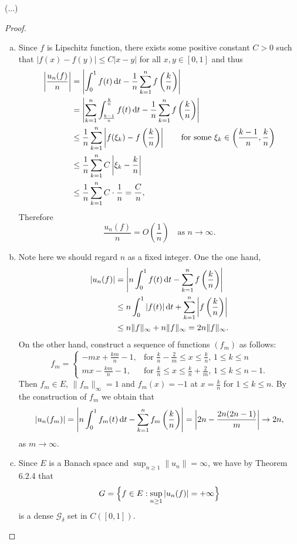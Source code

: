 \begin{exercise}
  (...)
\end{exercise}

\begin{proof}
  \begin{enumerate}[(a)]
    \item Since $f$ is Lipschitz function, there exists some positive constant $C>0$
      such that $|f(x)-f(y)|\leq C|x-y|$ for all $x,y\in [0,1]$ and thus
      \begin{align*}
        \left|\frac{u_n(f)}{n}\right|
        & = \left|\int_0^1 f(t) \mathop{}\!\mathrm{d} t-\frac{1}{n}\sum_{k=1}^nf\left(\frac{k}{n}\right)\right| \\
        & = \left|\sum_{k=1}^n\int_{\frac{k-1}{n}}^{\frac{k}{n}} f(t) \mathop{}\!\mathrm{d} t
            - \frac{1}{n}\sum_{k=1}^nf\left(\frac{k}{n}\right)\right| \\
        & \leq \frac{1}{n}\sum_{k=1}^n\left|f(\xi_k)-f\left(\frac{k}{n}\right)\right|
            \qquad \text{for some } \xi_k\in\left(\frac{k-1}{n},\frac{k}{n}\right) \\
        & \leq \frac{1}{n}\sum_{k=1}^nC\left|\xi_k-\frac{k}{n}\right| \\
        & \leq \frac{1}{n}\sum_{k=1}^nC\cdot\frac{1}{n}=\frac{C}{n},
      \end{align*}
      Therefore
      \[\frac{u_n(f)}{n}=O\left(\frac{1}{n}\right)\quad\text{as } n\to\infty.\]
    \item Note here we should regard $n$ as a fixed integer. One the one hand,
      \begin{align*}
        |u_n(f)|
        & = \left|n\int_0^1f(t)\mathop{}\!\mathrm{d} t-\sum_{k=1}^nf\left(\frac{k}{n}\right)\right| \\
        & \leq n\int_0^1|f(t)|\mathop{}\!\mathrm{d} t+\sum_{k=1}^n\left|f\left(\frac{k}{n}\right)\right| \\
        & \leq n\|f\|_{\infty}+n\|f\|_{\infty} = 2n\|f\|_{\infty}.
      \end{align*}
      On the other hand, construct a sequence of functions $(f_m)$ as follows:
      \[f_m = \begin{cases}
        -mx+\frac{km}{n}-1, & \text{for } \frac{k}{n}-\frac{2}{m}\leq x\leq\frac{k}{n},\, 1\leq k\leq n \\
        mx-\frac{km}{n}-1,  & \text{for } \frac{k}{n}\leq x\leq\frac{k}{n}+\frac{2}{m},\, 1\leq k\leq n-1.
      \end{cases}\]
      Then $f_m\in E$, $\|f_m\|_\infty = 1$ and $f_m(x) = -1$ at $x = \frac{k}{n}$
      for $1\leq k\leq n$. By the construction of $f_m$ we obtain that
      \[|u_n(f_{m})| = \left|n\int_0^1 f_m(t) \mathop{}\!\mathrm{d} t
        - \sum_{k=1}^n f_{m}\left(\frac{k}{n}\right)\right|
        = \left|2n-\frac{2n(2n-1)}{m}\right|\to 2n,\]
      as $m\to\infty$.
    \item Since $E$ is a Banach space and $\sup_{n\geq 1} \|u_n\| = \infty$,
     we have by Theorem 6.2.4 that
     \[G=\Bigl\{f\in E:\sup_{n\geq 1}|u_n(f)|=+\infty\Bigr\}\]
     is a dense $\mathcal{G}_\delta$ set in $C([0,1])$. \qedhere
  \end{enumerate}
\end{proof}


